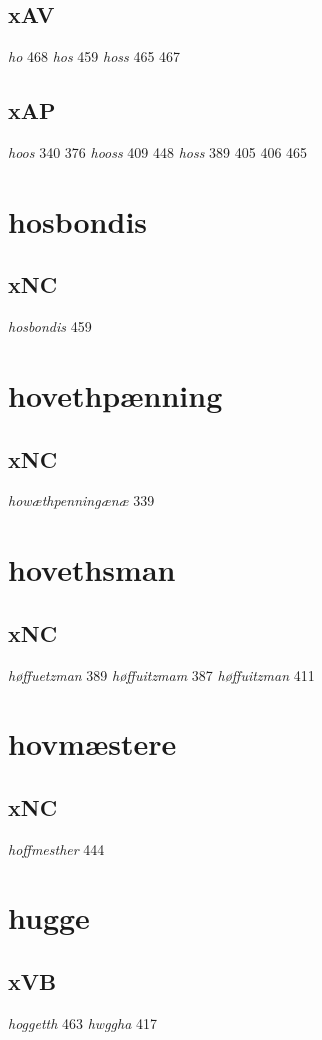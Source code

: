 \documentclass[a4paper,twocolumn]{article}
\begin{document}
\subsection{xAV}
\label{sec:orgcf24121}
\emph{ho} 468 \emph{hos} 459 \emph{hoss} 465 467 
\subsection{xAP}
\label{sec:orgfab0eb2}
\emph{hoos} 340 376 \emph{hooss} 409 448 \emph{hoss} 389 405 406 465 
\section{hosbondis}
\label{sec:org40a570e}
\subsection{xNC}
\label{sec:org5ceb840}
\emph{hosbondis} 459 
\section{hovethpænning}
\label{sec:orgcfa9b6b}
\subsection{xNC}
\label{sec:org6edcad2}
\emph{howæthpenningænæ} 339 
\section{hovethsman}
\label{sec:orgcbae3fc}
\subsection{xNC}
\label{sec:org0047ffa}
\emph{høffuetzman} 389 \emph{høffuitzmam} 387 \emph{høffuitzman} 411 
\section{hovmæstere}
\label{sec:orgd4869c7}
\subsection{xNC}
\label{sec:orgb7fcbaf}
\emph{hoffmesther} 444 
\section{hugge}
\label{sec:org91a7760}
\subsection{xVB}
\label{sec:orga4bfb57}
\emph{hoggetth} 463 \emph{hwggha} 417 
\end{document}

